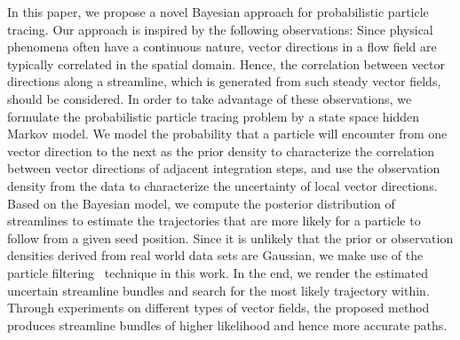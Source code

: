 \documentclass[review]{vgtc}                 %
\begin{document}
In this paper, we propose a novel Bayesian approach for probabilistic particle tracing. Our approach is inspired by the following observations: Since physical phenomena often have a continuous nature, vector directions in a flow field are typically correlated in the spatial domain. Hence, the correlation between vector directions along a streamline, which is generated from such steady vector fields, should be considered. In order to take advantage of these observations, we formulate the probabilistic particle tracing problem by a state space hidden Markov model. We model the probability that a particle will encounter from one vector direction to the next as the prior density to characterize the correlation between vector directions of adjacent integration steps, and use the observation density from the data to characterize the uncertainty of local vector directions. Based on the Bayesian model, we compute the posterior distribution of streamlines to estimate the trajectories that are more likely for a particle to follow from a given seed position. Since it is unlikely that the prior or observation densities derived from real world data sets are Gaussian, we make use of the particle filtering~\cite{doucet2001sequential} technique in this work. In the end, we render the estimated uncertain streamline bundles and search for the most likely trajectory within. Through experiments on different types of vector fields, the proposed method produces streamline bundles of higher likelihood and hence more accurate paths.













\end{document}
